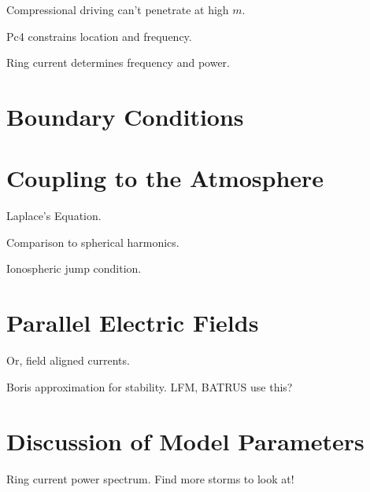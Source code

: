Compressional driving can't penetrate at high $m$. 

Pc4 constrains location and frequency. 

Ring current determines frequency and power. 

\section{Boundary Conditions}

\section{Coupling to the Atmosphere}

Laplace's Equation. 

Comparison to spherical harmonics. 

Ionospheric jump condition. 

\section{Parallel Electric Fields}

Or, field aligned currents. 

Boris approximation for stability. LFM, BATRUS use this? 


\section{Discussion of Model Parameters}

Ring current power spectrum. Find more storms to look at! 



